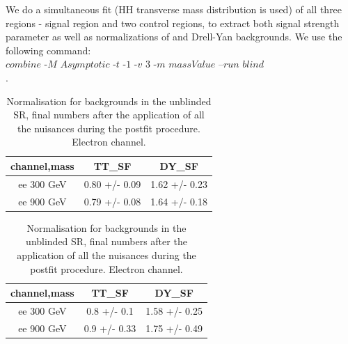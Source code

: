 We do a simultaneous fit (HH transverse mass distribution is used) of all three
regions - signal region and two control regions, to extract both
signal strength parameter as well as normalizations of \ttbar and
Drell-Yan backgrounds.  We use the following command:  \hfill \break
$\textit{combine 
-M Asymptotic -t -1 -v 3 -m massValue --run blind
comb\_card\_massValue.txt}$.


\begin{table}
\begin{center}
\caption{Normalization for backgrounds, final numbers after the application of all the nuisances during the postfit procedure. Electron channel.}
\begin{tabular}{ | c | c | c | }
  \hline
  channel,mass & TT\_SF & DY\_SF \\
  \hline
  ee 300 GeV    & 0.80 +/- 0.09   &  1.62 +/- 0.23\\
  ee 900 GeV    & 0.79 +/- 0.08    & 1.64 +/- 0.18\\
  \hline
\end{tabular}
\label{normalization_electron}
\end{center}
\begin{center}
\caption{Normalisation for backgrounds in the unblinded SR, final numbers after the application of all the nuisances during the postfit procedure. Electron channel.}
\begin{tabular}{ | c | c | c | }
  \hline
  channel,mass & TT\_SF & DY\_SF \\
  \hline
  ee 300 GeV    &  0.8 +/- 0.1    &   1.58 +/- 0.25 \\
 ee 900 GeV    &  0.9 +/- 0.33     &  1.75 +/- 0.49\\
  \hline
\end{tabular}
\label{normalization_electron_SR}
\end{center}
\end{table}


